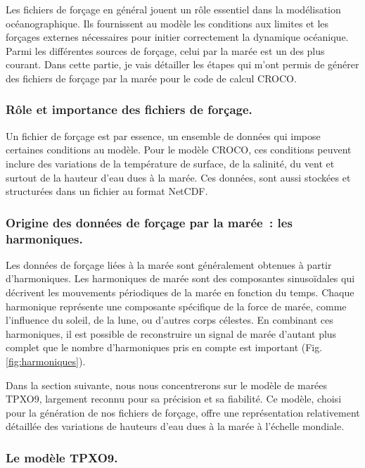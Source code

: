 Les fichiers de forçage en général jouent un rôle essentiel dans la modélisation océanographique. Ils fournissent au modèle les conditions aux limites et les forçages externes nécessaires pour initier correctement la dynamique océanique. Parmi les différentes sources de forçage, celui par la marée est un des plus courant. Dans cette partie, je vais détailler les étapes qui m'ont permis de générer des fichiers de forçage par la marée pour le code de calcul CROCO.

\subsubsection{Rôle et importance des fichiers de forçage.}

Un fichier de forçage est par essence, un ensemble de données qui impose certaines conditions au modèle. Pour le modèle CROCO, ces conditions peuvent inclure des variations de la température de surface, de la salinité, du vent et surtout de la hauteur d'eau dues à la marée. Ces données, sont aussi stockées et structurées dans un fichier au format NetCDF.

\subsubsection{Origine des données de forçage par la marée~: les harmoniques.}

Les données de forçage liées à la marée sont généralement obtenues à partir d'harmoniques. Les harmoniques de marée sont des composantes sinusoïdales qui décrivent les mouvements périodiques de la marée en fonction du temps. Chaque harmonique représente une composante spécifique de la force de marée, comme l'influence du soleil, de la lune, ou d'autres corps célestes. En combinant ces harmoniques, il est possible de reconstruire un signal de marée d'autant plus complet que le nombre d'harmoniques pris en compte est important (Fig. \ref{fig:harmoniques}).

Dans la section suivante, nous nous concentrerons sur le modèle de marées TPXO9, largement reconnu pour sa précision et sa fiabilité. Ce modèle, choisi pour la génération de nos fichiers de forçage, offre une représentation relativement détaillée des variations de hauteurs d'eau dues  à la marée à l'échelle mondiale.

\subsubsection{Le modèle TPXO9.}

